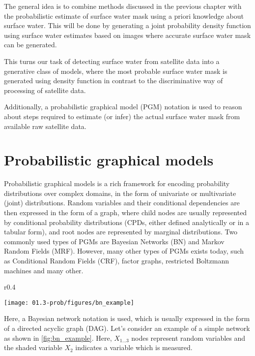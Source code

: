 The general idea is to combine methods discussed in the previous chapter with the probabilistic estimate of surface water mask using a priori knowledge about surface water. This will be done by generating a joint probability density function using surface water estimates based on images where accurate surface water mask can be generated. 

This turns our task of detecting surface water from satellite data into a generative class of models, where the most probable surface water mask is generated using density function in contrast to the discriminative way of processing of satellite data. 

Additionally, a probabilistic graphical model (PGM) notation is used to reason about steps required to estimate (or infer) the actual surface water mask from available raw satellite data.

\section{Probabilistic graphical models}

Probabilistic graphical models \cite{koller2009probabilistic} is a rich framework for encoding probability distributions over complex domains, in the form of univariate or multivariate (joint) distributions. Random variables and their conditional dependencies are then expressed in the form of a graph, where child nodes are usually represented by conditional probability distributions (CPDs, either defined analytically or in a tabular form), and root nodes are represented by marginal distributions. Two commonly used types of PGMs are Bayesian Networks (BN) and Markov Random Fields (MRF). However, many other types of PGMs exists today, such as Conditional Random Fields (CRF), factor graphs, restricted Boltzmann machines and many other.

\begin{wrapfigure}{r}{0.4\textwidth}
	\begin{center}
		\texttt{[image: 01.3-prob/figures/bn\_example]} 
	\end{center}
	\caption{An example of a simple Bayesian network.}
	\label{fig:bn_example}
\end{wrapfigure}

Here, a Bayesian network notation is used, which is usually expressed in the form of a directed acyclic graph (DAG). Let's consider an example of a simple network as shown in \ref{fig:bn_example}. Here, $X_{1...3}$ nodes represent random variables and the shaded variable $X_2$ indicates a variable which is measured. 


